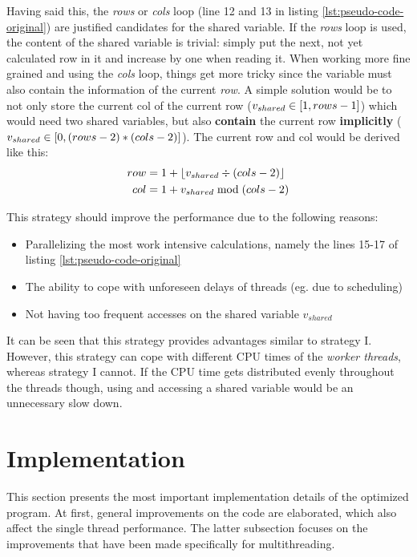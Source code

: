 Having said this, the \textit{rows} or \textit{cols} loop (line 12 and 13 in listing \ref{lst:pseudo-code-original}) are justified candidates for the shared variable. If the \textit{rows} loop is used, the content of the shared variable is trivial: simply put the next, not yet calculated row in it and increase by one when reading it. When working more fine grained and using the \textit{cols} loop, things get more tricky since the variable must also contain the information of the current \textit{row}. A simple solution would be to not only store the current col of the current row ($v_{shared} \in \interval{1}{rows-1}$) which would need two shared variables, but also \textbf{contain} the current row \textbf{implicitly} ($v_{shared} \in \interval{0}{(rows-2)*(cols-2)}$). The current row and col would be derived like this:
\begin{align*}
    row &= 1 + \left\lfloor v_{shared} \div (cols-2) \right\rfloor \\
    col &= 1 + v_{shared} \bmod (cols-2)
\end{align*}

This strategy should improve the performance due to the following reasons:
\begin{itemize}
    \item Parallelizing the most work intensive calculations, namely the lines 15-17 of listing \ref{lst:pseudo-code-original}
    \item The ability to cope with unforeseen delays of threads (eg. due to scheduling)
    \item Not having too frequent accesses on the shared variable $v_{shared}$
\end{itemize}

It can be seen that this strategy provides advantages similar to strategy I. However, this strategy can cope with different CPU times of the \textit{worker threads}, whereas strategy I cannot. If the CPU time gets distributed evenly throughout the threads though, using and accessing a shared variable would be an unnecessary slow down.


\section{Implementation}
\label{sec:implementation}

This section presents the most important implementation details of the optimized program. At first, general improvements on the code are elaborated, which also affect the single thread performance. The latter subsection focuses on the improvements that have been made specifically for multithreading.

